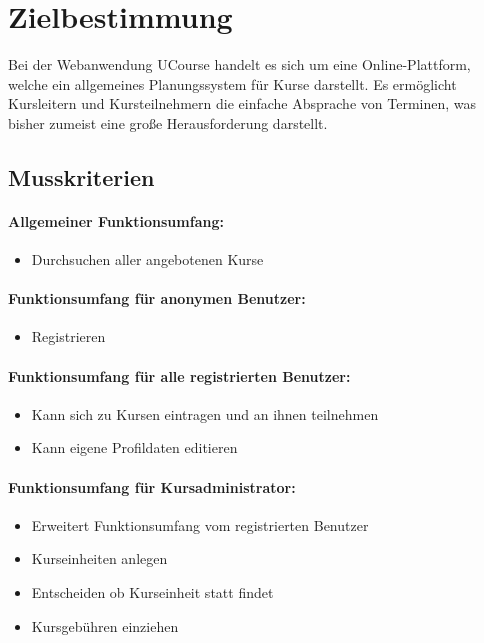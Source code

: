 \documentclass[a4paper]{scrreprt}
\begin{document}
 


\tableofcontents
 
\chapter{Zielbestimmung}
	   Bei der Webanwendung UCourse handelt es sich um eine Online-Plattform, welche ein allgemeines Planungssystem für Kurse darstellt. Es ermöglicht Kursleitern und Kursteilnehmern die einfache Absprache von Terminen, was bisher zumeist eine große Herausforderung darstellt.
    \section{Musskriterien}      
    	\subsubsection{Allgemeiner Funktionsumfang:}
      		\begin{itemize}
      		\item Durchsuchen aller angebotenen Kurse
      		\end{itemize}
     	\subsubsection{Funktionsumfang für anonymen Benutzer:}
       		\begin{itemize}
       		\item Registrieren
       		\end{itemize}
     	\subsubsection{Funktionsumfang für alle registrierten Benutzer:}
			\begin{itemize}
			\item Kann sich zu Kursen eintragen und an ihnen teilnehmen
			\item Kann eigene Profildaten editieren
			\end{itemize}
		\subsubsection{Funktionsumfang für Kursadministrator:}
			\begin{itemize}
			\item Erweitert Funktionsumfang vom \glqq registrierten Benutzer\grqq
			\item Kurseinheiten anlegen
			\item Entscheiden ob Kurseinheit statt findet
			\item Kursgebühren einziehen
			\end{itemize}
\end{document}
